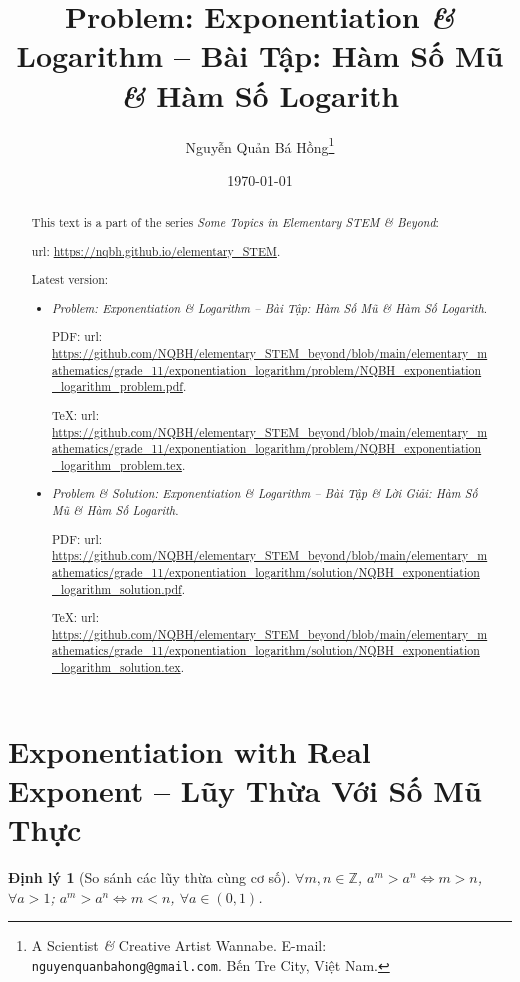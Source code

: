 \documentclass{article}
\title{Problem: Exponentiation {\it\&} Logarithm -- Bài Tập: Hàm Số Mũ {\it\&} Hàm Số Logarith}
\author{Nguyễn Quản Bá Hồng\footnote{A Scientist {\it\&} Creative Artist Wannabe. E-mail: {\tt nguyenquanbahong@gmail.com}. Bến Tre City, Việt Nam.}}
\date{\today}
\newtheorem{dinhly}{Định lý}
\begin{document}
\maketitle
\begin{abstract}
	This text is a part of the series {\it Some Topics in Elementary STEM \& Beyond}:
	
	{\sc url}: \url{https://nqbh.github.io/elementary_STEM}.
	
	Latest version:
	\begin{itemize}
		\item {\it Problem: Exponentiation \& Logarithm -- Bài Tập: Hàm Số Mũ \& Hàm Số Logarith}.
		
		PDF: {\sc url}: \url{https://github.com/NQBH/elementary_STEM_beyond/blob/main/elementary_mathematics/grade_11/exponentiation_logarithm/problem/NQBH_exponentiation_logarithm_problem.pdf}.
		
		\TeX: {\sc url}: \url{https://github.com/NQBH/elementary_STEM_beyond/blob/main/elementary_mathematics/grade_11/exponentiation_logarithm/problem/NQBH_exponentiation_logarithm_problem.tex}.
		\item {\it Problem \& Solution: Exponentiation \& Logarithm -- Bài Tập \& Lời Giải: Hàm Số Mũ \& Hàm Số Logarith}.
		
		PDF: {\sc url}: \url{https://github.com/NQBH/elementary_STEM_beyond/blob/main/elementary_mathematics/grade_11/exponentiation_logarithm/solution/NQBH_exponentiation_logarithm_solution.pdf}.
		
		\TeX: {\sc url}: \url{https://github.com/NQBH/elementary_STEM_beyond/blob/main/elementary_mathematics/grade_11/exponentiation_logarithm/solution/NQBH_exponentiation_logarithm_solution.tex}.
	\end{itemize}
\end{abstract}
\tableofcontents


\section{Exponentiation with Real Exponent -- Lũy Thừa Với Số Mũ Thực}

\begin{dinhly}[So sánh các lũy thừa cùng cơ số]
	\label{thm: so sanh luy thua cung co so}
	$\forall m,n\in\mathbb{Z}$, $a^m > a^n\Leftrightarrow m > n$, $\forall a > 1$; $a^m > a^n\Leftrightarrow m < n$, $\forall a\in(0,1)$.
\end{dinhly}
\end{document}
